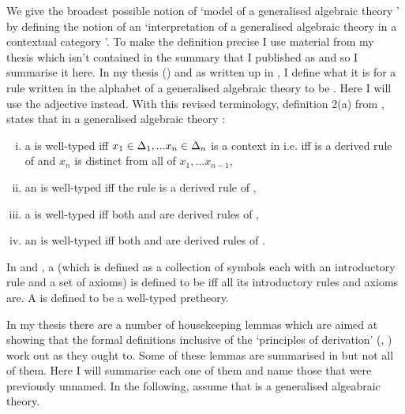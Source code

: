 \note
We give the broadest possible notion of `model
of a generalised algebraic theory \gatUw' by defining the notion of an `interpretation of  a generalised algebraic theory \gatUw in a contextual category \catc'.
\note To make the definition precise I use material from my thesis  \cite{Cartmell78} which isn't contained in
the summary that I  published as \cite{Cartmell86} and so I summarise it here.
\note 
In my thesis (\cite{Cartmell78}) and as written up in \cite{Cartmell86}, I define what it is for a rule written in the alphabet of a generalised algebraic theory to be . Here I will use the adjective  instead.
With this revised terminology, definition 2(a) from \cite{Cartmell86}, states that in  a generalised algebraic theory \gatUw:
\begin{enumerate} [(i)]
\item 
a \Trule {} is well-typed  iff 
$x_1 \in \Delta_1,... x_{n} \in \Delta_{n}$ is a context in \gatUw i.e. iff 
 is a derived rule of \gatUw and $x_n$ is distinct from all of $x_1,...x_{n-1}$, 
\item 
an \trule {} is well-typed iff
the rule  is a derived rule of \gatU,
\item 
a \Teqrule {} is well-typed iff
both  and  are derived rules
of \gatU,
\item 
an \teqrule {} is well-typed iff
both  and  are derived rules
of \gatU.
\end{enumerate}
In \cite{Cartmell78} and \cite{Cartmell86}, a  (which is defined as a collection of symbols each with an introductory rule and a set of axioms) is defined to be  iff all its introductory rules and axioms are. A  is defined to be a well-typed pretheory.

\note In my thesis there are a number of housekeeping lemmas which are aimed at showing that the formal definitions inclusive of the `principles of derivation' (\cite{Cartmell78}, \cite{Cartmell86}) work out as they ought to. Some of these lemmas are summarised in \cite{Cartmell86} but not all of them. Here I will summarise each one of them and name those that were previously unnamed. In the following, assume that \gatUw is a generalised algeabraic theory.

